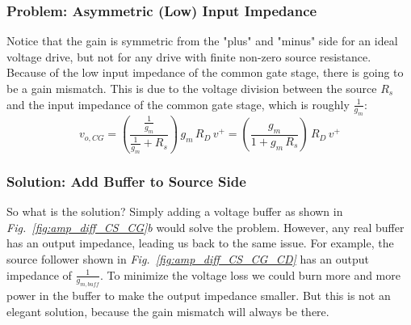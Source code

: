 \subsubsection{Problem:  Asymmetric (Low) Input Impedance}
Notice that the gain is symmetric from the "plus" and "minus" side for an ideal voltage drive, but not for any drive with finite non-zero source resistance.  Because of the low input impedance of the common gate stage, there is going to be a gain mismatch.  This is due to the voltage division between the source $R_s$ and the input impedance of the common gate stage, which is roughly $\frac{1}{g_m}$:
    \begin{equation}
        v_{o,CG} = \left(\frac{\frac{1}{g_m}}{\frac{1}{g_m} + R_s}\right)\,g_m\,R_D\,v^+
        = \left(\frac{g_m}{1 + g_m\,R_s}\right)\,R_D\,v^+
    \end{equation}
\subsubsection{Solution:  Add Buffer to Source Side}
So what is the solution?  Simply adding a voltage buffer as shown in \emph{Fig.~\ref{fig:amp_diff_CS_CG}b} would solve the problem.  However, any real buffer has an output impedance, leading us back to the same issue.  For example, the source follower shown in \emph{Fig.~\ref{fig:amp_diff_CS_CG_CD}} has an output impedance of $\frac{1}{g_{m,buff}}$.  To minimize the voltage loss we could burn more and more power in the buffer to make the output impedance smaller.  But this is not an elegant solution, because the gain mismatch will always be there.
